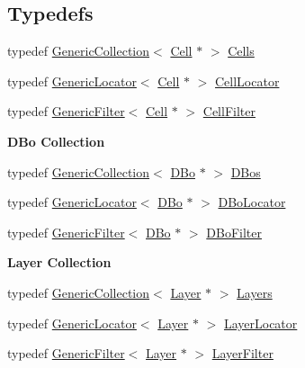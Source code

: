 \subsection*{Typedefs}
\begin{DoxyCompactItemize}
\item 
typedef \mbox{\hyperlink{classHurricane_1_1GenericCollection}{Generic\+Collection}}$<$ \mbox{\hyperlink{classHurricane_1_1Cell}{Cell}} $\ast$ $>$ \mbox{\hyperlink{namespaceHurricane_a8b4ab14b26f36f43d83a50294410b44a}{Cells}}
\item 
typedef \mbox{\hyperlink{classHurricane_1_1GenericLocator}{Generic\+Locator}}$<$ \mbox{\hyperlink{classHurricane_1_1Cell}{Cell}} $\ast$ $>$ \mbox{\hyperlink{namespaceHurricane_abd99adab3b5944a4d1ace3d0b0b34f57}{Cell\+Locator}}
\item 
typedef \mbox{\hyperlink{classHurricane_1_1GenericFilter}{Generic\+Filter}}$<$ \mbox{\hyperlink{classHurricane_1_1Cell}{Cell}} $\ast$ $>$ \mbox{\hyperlink{namespaceHurricane_addb0e9cd376680ecea4966516694b799}{Cell\+Filter}}
\end{DoxyCompactItemize}
\begin{Indent}\textbf{ D\+Bo Collection}\par
\begin{DoxyCompactItemize}
\item 
typedef \mbox{\hyperlink{classHurricane_1_1GenericCollection}{Generic\+Collection}}$<$ \mbox{\hyperlink{classHurricane_1_1DBo}{D\+Bo}} $\ast$ $>$ \mbox{\hyperlink{namespaceHurricane_a0aa3882e095f9d425c253223d1c0793d}{D\+Bos}}
\item 
typedef \mbox{\hyperlink{classHurricane_1_1GenericLocator}{Generic\+Locator}}$<$ \mbox{\hyperlink{classHurricane_1_1DBo}{D\+Bo}} $\ast$ $>$ \mbox{\hyperlink{namespaceHurricane_a7d70ef7ad837859e453171feb692535c}{D\+Bo\+Locator}}
\item 
typedef \mbox{\hyperlink{classHurricane_1_1GenericFilter}{Generic\+Filter}}$<$ \mbox{\hyperlink{classHurricane_1_1DBo}{D\+Bo}} $\ast$ $>$ \mbox{\hyperlink{namespaceHurricane_a2af87173f0c45c5dc1f504d3ea2317d9}{D\+Bo\+Filter}}
\end{DoxyCompactItemize}
\end{Indent}
\begin{Indent}\textbf{ Layer Collection}\par
\begin{DoxyCompactItemize}
\item 
typedef \mbox{\hyperlink{classHurricane_1_1GenericCollection}{Generic\+Collection}}$<$ \mbox{\hyperlink{classHurricane_1_1Layer}{Layer}} $\ast$ $>$ \mbox{\hyperlink{namespaceHurricane_a7b7200a36ab7ce8a157ddbe78b625f38}{Layers}}
\item 
typedef \mbox{\hyperlink{classHurricane_1_1GenericLocator}{Generic\+Locator}}$<$ \mbox{\hyperlink{classHurricane_1_1Layer}{Layer}} $\ast$ $>$ \mbox{\hyperlink{namespaceHurricane_a91a93ea29be3e6658d72f9bee0da8c7b}{Layer\+Locator}}
\item 
typedef \mbox{\hyperlink{classHurricane_1_1GenericFilter}{Generic\+Filter}}$<$ \mbox{\hyperlink{classHurricane_1_1Layer}{Layer}} $\ast$ $>$ \mbox{\hyperlink{namespaceHurricane_a150e0e72c5c5609e0feb3311fa5bc127}{Layer\+Filter}}
\end{DoxyCompactItemize}
\end{Indent}

